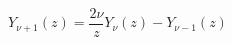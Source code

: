 \documentclass[12pt]{article}
\begin{document}
\begin{displaymath}
Y_{\nu+1}(z) = \frac{2\nu}{z}Y_\nu(z) - Y_{\nu-1}(z)
\end{displaymath}
\end{document}
